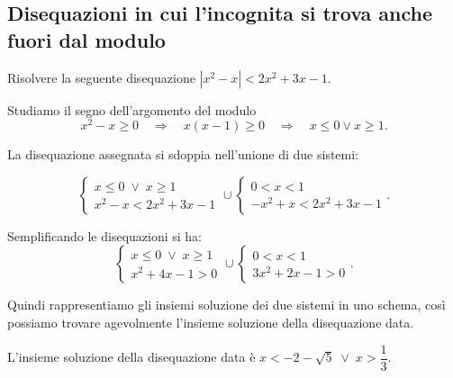 \subsection{Disequazioni in cui l'incognita si trova anche fuori dal modulo}

\begin{exrig}
\begin{esempio}
Risolvere la seguente disequazione $\left|x^2-x\right|<2x^2+3x-1$.

Studiamo il segno dell'argomento del modulo 
\[x^2-x\ge 0 \quad\Rightarrow\quad x(x-1)\ge 0 \quad\Rightarrow\quad x\le 0\vee x\ge 1.\]

La disequazione assegnata si sdoppia nell'unione di due sistemi:

\[\left\{\begin{array}{l}{x\le 0\;\vee\; x\ge 1}\\{x^2-x<2x^2+3x-1}\end{array}\right.\cup \left\{\begin{array}{l}{0<x<1}\\{-x^2+x<2x^2+3x-1}\end{array}\right..\]

 Semplificando le disequazioni si ha:
\begin{equation*}
\left\{\begin{array}{l}{x\le 0\;\vee\; x\ge 1}\\{x^2+4x-1>0}\end{array}\right.\cup \left\{\begin{array}{l}{0<x<1}\\{3x^2+2x-1>0}\end{array}\right..
\end{equation*}

Quindi rappresentiamo gli insiemi soluzione dei due sistemi in uno schema, così possiamo trovare agevolmente l'insieme soluzione della disequazione data.

\begin{center}

\end{center}

L'insieme soluzione della disequazione data è $x<-2-\sqrt 5\;\vee\; x>\dfrac 1 3$.
\end{esempio}
\end{exrig}

